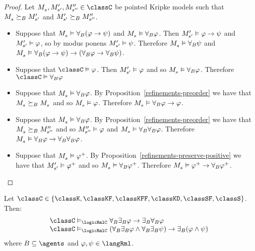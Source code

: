 \begin{proof}
Let $\kPModel{\kStateS}, \kPModelP{\kStateSP}, \kPModelPP{\kStateSPP} \in \classC$ be pointed Kripke models such that $\kPModel{\kStateS} \simulatesBs \kPModelP{\kStateSP}$ and ${M^{\prime}_{{s}^{\prime}}} \succeq_{B} {M^{\prime\prime}_{{s}^{\prime\prime}}}$.
\begin{itemize}
    \item 
        Suppose that $\kPModel{\kStateS} \entails \allrefsBs (\phi \implies \psi)$ and $\kPModel{\kStateS} \entails \allrefsBs \phi$.
        Then ${M^{\prime}_{{s}^{\prime}}} \vDash \varphi \rightarrow \psi$
        and ${M^{\prime}_{{s}^{\prime}}} \vDash \varphi$,
        so by modus ponens ${M^{\prime}_{{s}^{\prime}}} \vDash \psi$.
        Therefore $\kPModel{\kStateS} \entails \allrefsBs \psi$
        and $\kPModel{\kStateS} \entails \allrefsBs (\phi \implies \psi) \implies (\allrefsBs \phi \implies \allrefsBs \psi)$.
    \item
        Suppose that $\classC \entails \phi$. 
        Then ${M^{\prime}_{{s}^{\prime}}} \vDash \varphi$ and so $\kPModel{\kStateS} \entails \allrefsBs \phi$.
        Therefore $\classC \entails \allrefsBs \phi$
    \item
        Suppose that $\kPModel{\kStateS} \entails \allrefsBs \phi$.
        By Proposition~\ref{refinements-preorder} we have that $\kPModel{\kStateS} \simulatesBs \kPModel{\kStateS}$ and so $\kPModel{\kStateS} \entails \phi$.
        Therefore $\kPModel{\kStateS} \entails \allrefsBs \phi \implies \phi$.
    \item
        Suppose that $\kPModel{\kStateS} \entails \allrefsBs \phi$.
        By Proposition~\ref{refinements-preorder} we have that $\kPModel{\kStateS} \simulatesBs \kPModelPP{\kStateSPP}$ and so ${M^{\prime\prime}_{{s}^{\prime\prime}}} \vDash \varphi$ and $\kPModel{\kStateS} \entails \allrefsBs \allrefsBs \phi$.
        Therefore $\kPModel{\kStateS} \entails \allrefsBs \phi \implies \allrefsBs \allrefsBs \phi$.
    \item
        Suppose that $\kPModel{\kStateS} \entails \phi^+$.
        By Proposition~\ref{refinements-preserve-positive} we have that ${M^{\prime}_{{s}^{\prime}}} \vDash \varphi^+$ and so $\kPModel{\kStateS} \entails \allrefsBs \phi^+$.
        Therefore $\kPModel{\kStateS} \entails \phi^+ \implies \allrefsBs \phi^+$.
\end{itemize}
\end{proof}

\begin{proposition}\label{rml-mckinsey}
Let $\classC \in \{\classK, \classKF, \classKFF, \classKD, \classSF, \classS\}$. Then:
$$
\begin{array}{l}
    \classC \entails_\logicRmlC \allrefsBs \somerefsBs \phi \implies \somerefsBs \allrefsBs \phi\\
    \classC \entails_\logicRmlC (\allrefsBs \somerefsBs \phi \land \allrefsBs \somerefsBs \psi) \implies \somerefsBs (\phi \land \psi)
\end{array}
$$
where $\agentsB \subseteq \agents$ and $\phi, \psi \in \langRml$.
\end{proposition}

